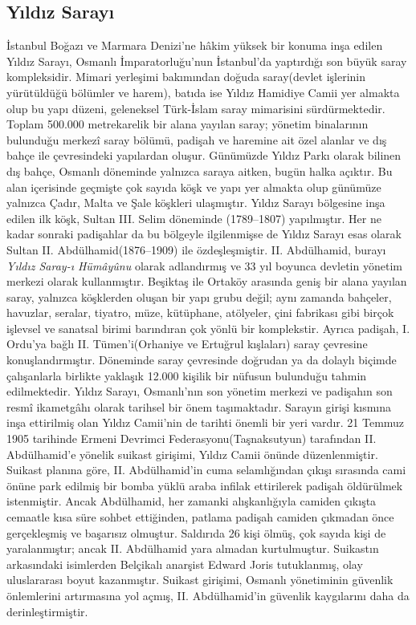 \subsection{Yıldız Sarayı}
\indent\indent İstanbul Boğazı ve Marmara Denizi’ne hâkim yüksek bir konuma inşa edilen Yıldız Sarayı, Osmanlı İmparatorluğu'nun İstanbul’da yaptırdığı son büyük saray kompleksidir. Mimari yerleşimi bakımından doğuda saray(devlet işlerinin yürütüldüğü bölümler ve harem), batıda ise Yıldız Hamidiye Camii yer almakta olup bu yapı düzeni, geleneksel Türk-İslam saray mimarisini sürdürmektedir. Toplam 500.000 metrekarelik bir alana yayılan saray; yönetim binalarının bulunduğu merkezî saray bölümü, padişah ve haremine ait özel alanlar ve dış bahçe ile çevresindeki yapılardan oluşur. Günümüzde Yıldız Parkı olarak bilinen dış bahçe, Osmanlı döneminde yalnızca saraya aitken, bugün halka açıktır. Bu alan içerisinde geçmişte çok sayıda köşk ve yapı yer almakta olup günümüze yalnızca Çadır, Malta ve Şale köşkleri ulaşmıştır.\newline
\indent Yıldız Sarayı bölgesine inşa edilen ilk köşk, Sultan III. Selim döneminde (1789–1807) yapılmıştır. Her ne kadar sonraki padişahlar da bu bölgeyle ilgilenmişse de Yıldız Sarayı esas olarak Sultan II. Abdülhamid(1876–1909) ile özdeşleşmiştir. II. Abdülhamid, burayı \textit{Yıldız Saray-ı Hümâyûnu} olarak adlandırmış ve 33 yıl boyunca devletin yönetim merkezi olarak kullanmıştır. Beşiktaş ile Ortaköy arasında geniş bir alana yayılan saray, yalnızca köşklerden oluşan bir yapı grubu değil; aynı zamanda bahçeler, havuzlar, seralar, tiyatro, müze, kütüphane, atölyeler, çini fabrikası gibi birçok işlevsel ve sanatsal birimi barındıran çok yönlü bir komplekstir. Ayrıca padişah, I. Ordu’ya bağlı II. Tümen’i(Orhaniye ve Ertuğrul kışlaları) saray çevresine konuşlandırmıştır. Döneminde saray çevresinde doğrudan ya da dolaylı biçimde çalışanlarla birlikte yaklaşık 12.000 kişilik bir nüfusun bulunduğu tahmin edilmektedir. Yıldız Sarayı, Osmanlı'nın son yönetim merkezi ve padişahın son resmî ikametgâhı olarak tarihsel bir önem taşımaktadır.\newline
\indent Sarayın girişi kısmına inşa ettirilmiş olan Yıldız Camii'nin de tarihti önemli bir yeri vardır. 21 Temmuz 1905 tarihinde Ermeni Devrimci Federasyonu(Taşnaksutyun) tarafından II. Abdülhamid'e yönelik suikast girişimi, Yıldız Camii önünde düzenlenmiştir. Suikast planına göre, II. Abdülhamid’in cuma selamlığından çıkışı sırasında cami önüne park edilmiş bir bomba yüklü araba infilak ettirilerek padişah öldürülmek istenmiştir. Ancak Abdülhamid, her zamanki alışkanlığıyla camiden çıkışta cemaatle kısa süre sohbet ettiğinden, patlama padişah camiden çıkmadan önce gerçekleşmiş ve başarısız olmuştur. Saldırıda 26 kişi ölmüş, çok sayıda kişi de yaralanmıştır; ancak II. Abdülhamid yara almadan kurtulmuştur. Suikastın arkasındaki isimlerden Belçikalı anarşist Edward Joris tutuklanmış, olay uluslararası boyut kazanmıştır. Suikast girişimi, Osmanlı yönetiminin güvenlik önlemlerini artırmasına yol açmış, II. Abdülhamid’in güvenlik kaygılarını daha da derinleştirmiştir.\newline
